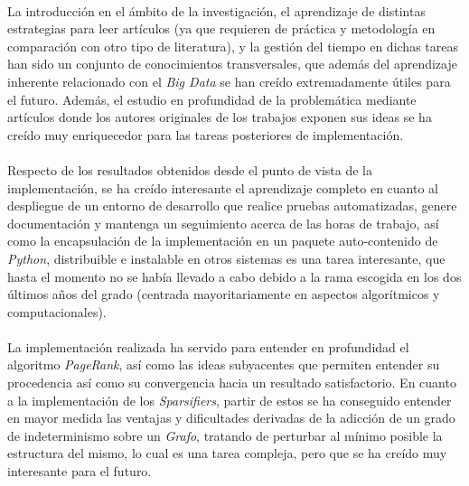 \documentclass{subfiles}
\begin{document}
      \paragraph{}
      La introducción en el ámbito de la investigación, el aprendizaje de distintas estrategias para leer artículos (ya que requieren de práctica y metodología en comparación con otro tipo de literatura), y la gestión del tiempo en dichas tareas han sido un conjunto de conocimientos transversales, que además del aprendizaje inherente relacionado con el \emph{Big Data} se han creído extremadamente útiles para el futuro. Además, el estudio en profundidad de la problemática mediante artículos donde los autores originales de los trabajos exponen sus ideas se ha creído muy enriquecedor para las tareas posteriores de implementación.

      \paragraph{}
      Respecto de los resultados obtenidos desde el punto de vista de la implementación, se ha creído interesante el aprendizaje completo en cuanto al despliegue de un entorno de desarrollo que realice pruebas automatizadas, genere documentación y mantenga un seguimiento acerca de las horas de trabajo, así como la encapsulación de la implementación en un paquete auto-contenido de \emph{Python}, distribuible e instalable en otros sistemas es una tarea interesante, que hasta el momento no se había llevado a cabo debido a la rama escogida en los dos últimos años del grado (centrada mayoritariamente en aspectos algorítmicos y computacionales).

      \paragraph{}
      La implementación realizada ha servido para entender en profundidad el algoritmo \emph{PageRank}, así como las ideas subyacentes que permiten entender su procedencia así como su convergencia hacia un resultado satisfactorio. En cuanto a la implementación de los \emph{Sparsifiers}, partir de estos se ha conseguido entender en mayor medida las ventajas y dificultades derivadas de la adicción de un grado de indeterminismo sobre un \emph{Grafo}, tratando de perturbar al mínimo posible la estructura del mismo, lo cual es una tarea compleja, pero que se ha creído muy interesante para el futuro.
\end{document}
